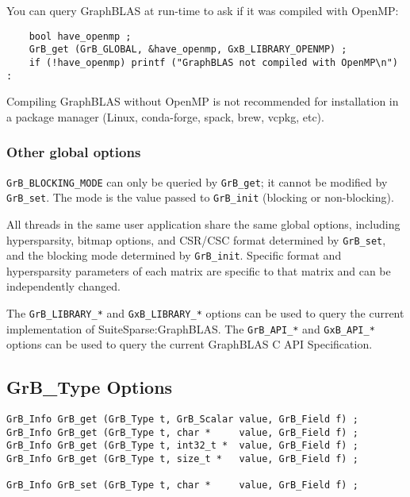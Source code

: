 You can query GraphBLAS at run-time to ask if it was compiled with OpenMP:

{\small
\begin{verbatim}
    bool have_openmp ;
    GrB_get (GrB_GLOBAL, &have_openmp, GxB_LIBRARY_OPENMP) ;
    if (!have_openmp) printf ("GraphBLAS not compiled with OpenMP\n") : \end{verbatim}}

Compiling GraphBLAS without OpenMP is not recommended for installation in a
package manager (Linux, conda-forge, spack, brew, vcpkg, etc).

\subsubsection{Other global options}

\verb'GrB_BLOCKING_MODE' can only be queried by \verb'GrB_get'; it cannot be
modified by \verb'GrB_set'.  The mode is the value passed to \verb'GrB_init'
(blocking or non-blocking).

All threads in the same user application share the same global options,
including hypersparsity, bitmap options, and CSR/CSC format determined by
\verb'GrB_set', and the blocking mode determined by \verb'GrB_init'.
Specific format and hypersparsity parameters of each matrix are specific to
that matrix and can be independently changed.

The \verb'GrB_LIBRARY_*' and \verb'GxB_LIBRARY_*' options can be used to query
the current implementation of SuiteSparse:GraphBLAS.  The \verb'GrB_API_*' and
\verb'GxB_API_*' options can be used to query the current GraphBLAS C API
Specification.

\newpage
\subsection{{\sf GrB\_Type} Options}
\label{get_set_type}

\begin{mdframed}[userdefinedwidth=6in]
{\footnotesize
\begin{verbatim}
GrB_Info GrB_get (GrB_Type t, GrB_Scalar value, GrB_Field f) ;
GrB_Info GrB_get (GrB_Type t, char *     value, GrB_Field f) ;
GrB_Info GrB_get (GrB_Type t, int32_t *  value, GrB_Field f) ;
GrB_Info GrB_get (GrB_Type t, size_t *   value, GrB_Field f) ;

GrB_Info GrB_set (GrB_Type t, char *     value, GrB_Field f) ;
\end{verbatim}
}\end{mdframed}

